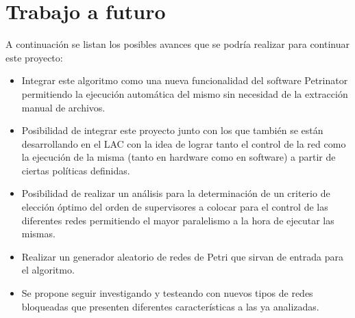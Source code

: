 \newpage
\section{Trabajo a futuro} \label{trabajofuturo}
A continuación se listan los posibles avances que se podría realizar para continuar este proyecto:

\begin{itemize}
    \item Integrar este algoritmo como una nueva funcionalidad del software Petrinator permitiendo la ejecución automática del mismo sin necesidad de la extracción manual de archivos.
    
    \item Posibilidad de integrar este proyecto junto con los que también se están desarrollando en el LAC con la idea de lograr tanto el control de la red como la ejecución de la misma (tanto en hardware como en software) a partir de ciertas políticas definidas. 
    
    \item Posibilidad de realizar un análisis para la determinación de un criterio de elección óptimo del orden de supervisores a colocar para el control de las diferentes redes permitiendo el mayor paralelismo a la hora de ejecutar las mismas. 
    
    
    \item Realizar un generador aleatorio de redes de Petri que sirvan de entrada para el algoritmo.
    
    \item Se propone seguir investigando y testeando con nuevos tipos de redes bloqueadas que presenten diferentes características a las ya analizadas.
    
\end{itemize}

